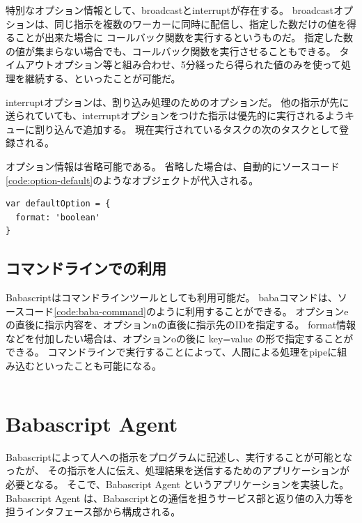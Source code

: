 特別なオプション情報として、broadcastとinterruptが存在する。
broadcastオプションは、同じ指示を複数のワーカーに同時に配信し、指定した数だけの値を得ることが出来た場合に
コールバック関数を実行するというものだ。
指定した数の値が集まらない場合でも、コールバック関数を実行させることもできる。
タイムアウトオプション等と組み合わせ、5分経ったら得られた値のみを使って処理を継続する、といったことが可能だ。

interruptオプションは、割り込み処理のためのオプションだ。
他の指示が先に送られていても、interruptオプションをつけた指示は優先的に実行されるようキューに割り込んで追加する。
現在実行されているタスクの次のタスクとして登録される。

オプション情報は省略可能である。
省略した場合は、自動的にソースコード\ref{code:option-default}のようなオブジェクトが代入される。

\begin{lstlisting}[caption=デフォルトのオプション情報, label=code:option-default]
var defaultOption = {
  format: 'boolean'
}
\end{lstlisting}

\subsection{コマンドラインでの利用}\label{ux30b3ux30deux30f3ux30c9ux30e9ux30a4ux30f3ux3067ux306eux5229ux7528}

Babascriptはコマンドラインツールとしても利用可能だ。
babaコマンドは、ソースコード\ref{code:baba-command}のように利用することができる。
オプションeの直後に指示内容を、オプションnの直後に指示先のIDを指定する。
format情報などを付加したい場合は、オプションoの後に key=value
の形で指定することができる。
コマンドラインで実行することによって、人間による処理をpipeに組み込むといったことも可能になる。

\begin{lstlisting}[caption=Babaコマンド, label=code:baba-command]
% baba -e to_human_message -o format=boolean
\end{lstlisting}

\section{Babascript Agent}\label{babascript-agent}

Babascriptによって人への指示をプログラムに記述し、実行することが可能となったが、
その指示を人に伝え、処理結果を送信するためのアプリケーションが必要となる。
そこで、Babascript Agent というアプリケーションを実装した。 Babascript
Agent
は、Babascriptとの通信を担うサービス部と返り値の入力等を担うインタフェース部から構成される。

